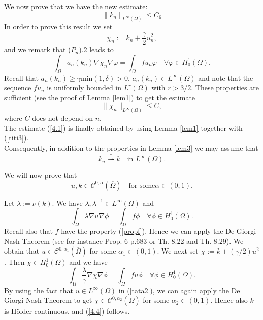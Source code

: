 \documentclass{elsart}
\begin{document}
We now prove that we have the new estimate:
\begin{equation}
\|k_n\|_{L^{\infty}(\Omega)} \leq C_6 \label{4.1}
\end{equation}
In order to prove this result we set 
\begin{equation} 
\chi_n := k_n + \frac{\gamma}{2} u_n^2, \label{titi2}
\end{equation}
and we remark that ($P_n$).2 leads to 
$$\int_{\Omega} a_n(k_n) \nabla \chi_n \nabla \varphi = 
\int_{\Omega} f u_n \varphi \quad \forall \varphi \in H^1_0(\Omega).$$
Recall that $a_n(k_n)\geq \gamma \text{min}(1,\delta)>0$, $a_n(k_n)\in
L^{\infty}(\Omega)$ and note that the sequence $fu_n$ is uniformly
bounded in $L^r(\Omega)$ with  $r>3/2$. These properties are sufficient (see
the proof of Lemma \ref{lem1}) to get the estimate 
\begin{equation}
\|\chi_n\|_{L^{\infty}(\Omega)} \leq C, \label{titi3}
\end{equation}
where $C$ does not depend on $n$. \\ 
The estimate (\ref{4.1}) is finally obtained by using Lemma \ref{lem1} together
with (\ref{titi3}). \\ 
Consequently, in addition to the properties in Lemma \ref{lem3} we may
assume that 
\begin{equation}
k_n \overset{*}{\rightharpoonup} k \quad \text{in } L^{\infty}(\Omega). 
\label{4.2}
\end{equation}

We will now prove that 
\begin{equation}
u,k \in \mathcal{C}^{0,\alpha}(\overline{\Omega}) \quad \text{for some
} \alpha \in (0,1). \label{4.4}
\end{equation}  

Let $\lambda:=\nu(k)$. We have $\lambda, \lambda^{-1} \in
L^{\infty}(\Omega)$ and 
\begin{equation}
\int_{\Omega} \lambda \nabla u \nabla \phi = \int_{\Omega} f \phi
\quad \forall \phi \in H_0^1(\Omega). \label{tata1}
\end{equation}
Recall also that $f$ have the property (\ref{propf}). Hence 
we can apply the De Giorgi-Nash Theorem (see for instance
\cite{DL} Prop. 6 p.683 or \cite{gil} Th. 8.22 and Th. 8.29). We obtain that 
$u \in \mathcal{C}^{0,\alpha_1}(\overline{\Omega})$ for some $\alpha_1
\in (0,1)$. We next set $\chi:=k+(\gamma/2)u^2$. Then 
$\chi \in H_0^1(\Omega)$ and we have  
\begin{equation}
\int_{\Omega} \frac{\lambda}{\gamma} \nabla \chi \nabla \phi = 
\int_{\Omega} fu \phi \quad \forall \phi \in H_0^1(\Omega).
\label{tata2}
\end{equation}
By using the fact that $u \in L^{\infty}(\Omega)$ in 
(\ref{tata2}), we can again apply the De Giorgi-Nash Theorem to get 
$\chi \in \mathcal{C}^{0,\alpha_2}(\overline{\Omega})$ for some $\alpha_2
\in (0,1)$. Hence also $k$ is H\"older continuous, and (\ref{4.4})
follows. \\ 
\end{document}
